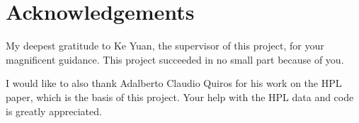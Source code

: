 \documentclass{l4proj}
\begin{document}
\chapter*{Acknowledgements}
%
%

My deepest gratitude to Ke Yuan, the supervisor of this project, for your magnificent guidance. This project succeeded in no small part because of you.

I would like to also thank Adalberto Claudio Quiros for his work on the HPL paper, which is the basis of this project. Your help with the HPL data and code is greatly appreciated.


%
%
\def\consentname {Jetanat Sihanatkathakul} %
\def\consentdate {05 Febuary 2025} %
%
\educationalconsent


\tableofcontents

%
%
%
\end{document}
